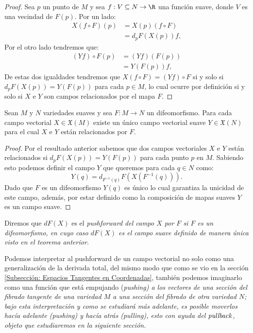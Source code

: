 \begin{proof}
	Sea $p$ un punto de $M$ y sea $f: V \subseteq N \to \R$ una función suave, donde $V$ es una vecindad de $F(p)$. Por un lado:
	\begin{align*}
		X(f \circ F)(p) & = X(p)(f \circ F) \\
		                & = d_pF(X(p))f,
	\end{align*}
	Por el otro lado tendremos que:
	\begin{align*}
		(Yf) \circ F(p) & = (Yf)(F(p)) \\
		                & = Y(F(p))f,
	\end{align*}
	De estas dos igualdades tendremos que $X(f \circ F) = (Yf)\circ F$ si y solo si $d_pF(X(p)) = Y(F(p))$ para cada $p \in M$, lo cual ocurre por definición si y solo si $X$ e $Y$ son campos relacionados por el mapa $F$.
\end{proof}

\begin{theorem}
	Sean $M$ y $N$ variedades suaves y sea $F: M \to N$ un difeomorfismo. Para cada campo vectorial $X \in \mathfrak{X}(M)$ existe un único campo vectorial suave $Y \in \mathfrak{X}(N)$ para el cual $X$ e $Y$ están relacionados por $F$.
\end{theorem}

\begin{proof}
	Por el resultado anterior sabemos que dos campos vectoriales $X$ e $Y$ están relacionados si $d_p F(X(p))= Y(F(p))$ para cada punto $p$ en $M$. Sabiendo esto podemos definir el campo $Y$ que queremos para cada $q \in N$ como:
	\[
		Y(q) = d_{F^{-1}(q)} F ( X (F^{-1}(q))).
	\]
	Dado que $F$ es un difeomorfismo $Y(q)$ es único lo cual garantiza la unicidad de este campo, además, por estar definido como la composición de mapas suaves $Y$ es un campo suave.
\end{proof}

\begin{definition}
  Diremos que $dF(X)$ es el \it{pushforward del campo $X$ por $F$} si $F$ es un difeomorfismo, en cuyo caso $dF(X)$ es el campo suave definido de manera única visto en el teorema anterior.
\end{definition}

Podemos interpretar al pushforward de un campo vectorial no solo como una generalización de la derivada total, del mismo modo que como se vio en la sección \ref{Subsección: Espacios Tangentes en Coordenadas}, también podemos imaginarlo como una función que está empujando (\it{pushing}) a los vectores de una sección del fibrado tangente de una variedad $M$ a una sección del fibrado de otra variedad $N$; bajo esta interpretación y como se estudiará más adelante, es posible moverlos hacía adelante (\it{pushing}) y hacía atrás (\it{pulling}), esto con ayuda del $\it{pullback}$, objeto que estudiaremos en la siguiente sección.
